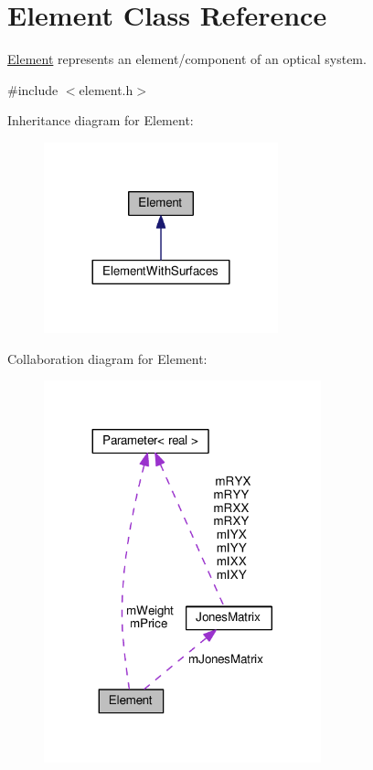\hypertarget{classElement}{}\section{Element Class Reference}
\label{classElement}


\hyperlink{classElement}{Element} represents an element/component of an optical system.  




{\ttfamily \#include $<$element.\+h$>$}



Inheritance diagram for Element\+:\nopagebreak
\begin{figure}[H]
\begin{center}
\leavevmode
\includegraphics[width=192pt]{classElement__inherit__graph}
\end{center}
\end{figure}


Collaboration diagram for Element\+:
\nopagebreak
\begin{figure}[H]
\begin{center}
\leavevmode
\includegraphics[width=227pt]{classElement__coll__graph}
\end{center}
\end{figure}
